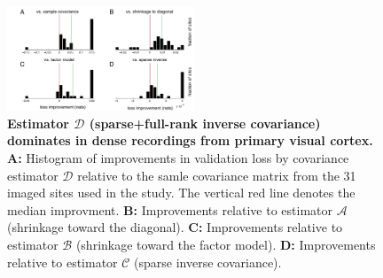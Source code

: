 \begin{figure}[htp]
\centering
\includegraphics[width=0.5\textwidth]{figures/Figure4.pdf}
\caption{{\bf Estimator $\mathcal D$ (sparse+full-rank inverse covariance) dominates in dense recordings from primary visual cortex.}
{\bf A:}  Histogram of improvements in validation loss by covariance estimator $\mathcal D$ relative to the samle covariance matrix from the 31 imaged sites used in the study.  The vertical red line denotes the median improvment. 
{\bf B:} Improvements relative to estimator $\mathcal A$ (shrinkage toward the diagonal).
{\bf C:} Improvements relative to estimator $\mathcal B$ (shrinkage toward the factor model).
{\bf D:} Improvements relative to estimator $\mathcal C$ (sparse inverse covariance).
}\label{fig:04}
\end{figure}